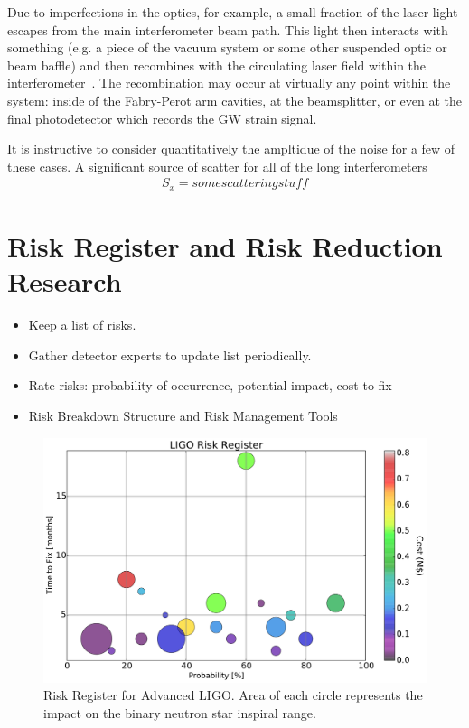 Due to imperfections in the optics, for example, a small fraction of the laser light escapes from the main interferometer beam path. This light then interacts with something (e.g. a piece of the vacuum system or some other suspended optic or beam baffle) and then recombines with the circulating laser field within the 
interferometer~\cite{Kip:Scatter95, Kip:scatter1989, Sam:Scatter2012, Stefano:Scatter, Vinet:scatter, fritschel1998high}. The recombination may occur at virtually any point within the system: inside of the Fabry-Perot arm cavities, at the beamsplitter, or even at the final photodetector which records the GW strain signal.

It is instructive to consider quantitatively the ampltidue of the noise for a few of these cases. A significant source of scatter for all of the long interferometers
\begin{align}
S_x = some scattering stuff
\end{align}


\section{Risk Register and Risk Reduction Research}

\begin{itemize}
  \item Keep a list of risks.
  \item Gather detector experts to update list periodically.
  \item Rate risks: probability of occurrence, potential impact, cost to fix
  \item Risk Breakdown Structure and Risk Management Tools
\end{itemize}

\begin{figure}[h]
\centering
\includegraphics[width=\columnwidth]{Figures/Risk.pdf}
\caption{Risk Register for Advanced LIGO. Area of each circle represents the impact on the binary neutron star inspiral range.}
\label{fig:RiskBubbles}
\end{figure}


